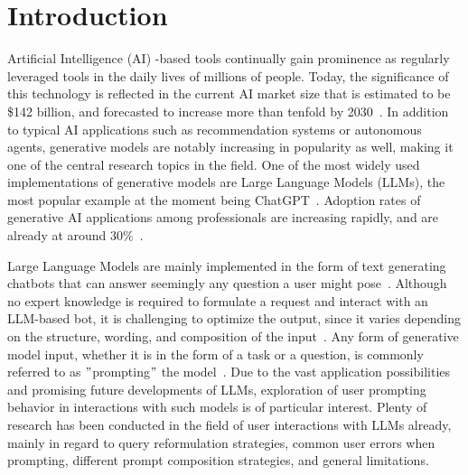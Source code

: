 \section{Introduction}
\label{sec:introduction}

\sloppy %
Artificial Intelligence (AI) -based tools continually gain prominence as regularly leveraged tools in the
daily lives of millions of people.
Today, the significance of this technology is reflected in the current AI market size that is
estimated to be \$142 billion, and forecasted to increase more than tenfold by 2030~\cite{statista_artificial_2023}.
In addition to typical AI applications such as recommendation systems or autonomous agents, generative
models are notably increasing in popularity as well, making it one of the central research topics
in the field.
One of the most widely used implementations of generative models are Large Language Models (LLMs),
the most popular example at the moment being ChatGPT~\cite{openai_chatgpt_2023}.
Adoption rates of generative AI applications among professionals are increasing rapidly, and are
already at around 30\%~\cite{statista_us_2022}.

Large Language Models are mainly implemented in the form of text generating chatbots that can
answer seemingly any question a user might pose~\cite{ge_openagi_2023}.
Although no expert knowledge is required to formulate a request and interact with an LLM-based bot, it is challenging to optimize the output, since it varies depending on the structure, wording,
and composition of the input~\cite{radford_improving_2018}.
Any form of generative model input, whether it is in the form of a task or a question, is
commonly referred to as \("\)prompting\("\) the model~\cite[p. 1]{white_prompt_2023}.
Due to the vast application possibilities and promising future developments of LLMs, exploration of
user prompting behavior in interactions with such models is of particular interest.
Plenty of research has been conducted in the field of user interactions with LLMs already,
mainly in regard to query reformulation strategies, common user errors when prompting,
different prompt composition strategies, and general limitations.

